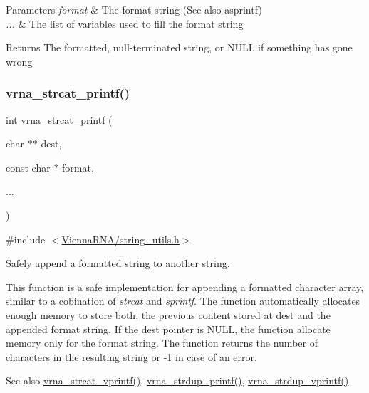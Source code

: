 \begin{DoxyParams}{Parameters}
{\em format} & The format string (See also asprintf) \\
\hline
{\em ...} & The list of variables used to fill the format string \\
\hline
\end{DoxyParams}
\begin{DoxyReturn}{Returns}
The formatted, null-\/terminated string, or N\+U\+LL if something has gone wrong 
\end{DoxyReturn}
\mbox{\label{group__string__utils_gac0771ec71316023067f2aae61a5aa0fb}} 
\subsubsection{\texorpdfstring{vrna\+\_\+strcat\+\_\+printf()}{vrna\_strcat\_printf()}}
{\footnotesize\ttfamily int vrna\+\_\+strcat\+\_\+printf (\begin{DoxyParamCaption}\item[{char $\ast$$\ast$}]{dest,  }\item[{const char $\ast$}]{format,  }\item[{}]{... }\end{DoxyParamCaption})}



{\ttfamily \#include $<$\hyperlink{string__utils_8h}{Vienna\+R\+N\+A/string\+\_\+utils.\+h}$>$}



Safely append a formatted string to another string. 

This function is a safe implementation for appending a formatted character array, similar to a cobination of {\itshape strcat} and {\itshape sprintf}. The function automatically allocates enough memory to store both, the previous content stored at {\ttfamily dest} and the appended format string. If the {\ttfamily dest} pointer is N\+U\+LL, the function allocate memory only for the format string. The function returns the number of characters in the resulting string or -\/1 in case of an error.

\begin{DoxySeeAlso}{See also}
\hyperlink{group__string__utils_ga122df216996ba62fd5056b7743e3131a}{vrna\+\_\+strcat\+\_\+vprintf()}, \hyperlink{group__string__utils_ga33cc0190a326ec368277caa777b8bf18}{vrna\+\_\+strdup\+\_\+printf()}, \hyperlink{group__string__utils_ga459fdee190ed81bb7773cbaf671748a9}{vrna\+\_\+strdup\+\_\+vprintf()}
\end{DoxySeeAlso}

